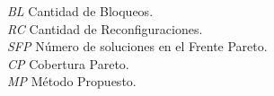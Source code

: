 \begin{tabbing}
\textit{BL} \>\>\> Cantidad de Bloqueos.\\
\textit{RC} \>\>\> Cantidad de Reconfiguraciones.\\
\textit{SFP} \>\>\> Número de soluciones en el Frente Pareto.\\
\textit{CP} \>\>\> Cobertura Pareto.\\
\textit{MP} \>\>\> Método Propuesto.
\end{tabbing}
